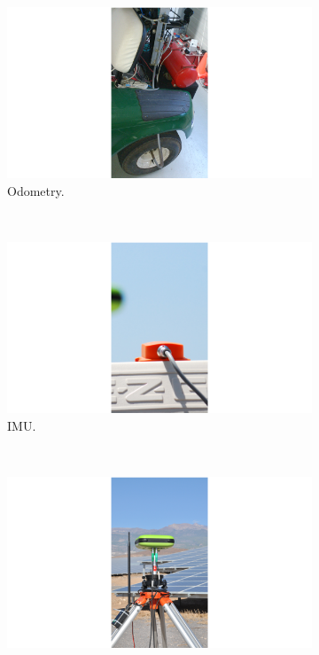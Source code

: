 \begin{figure}[h!]
        \centering
        \begin{subfigure}[b]{0.32\textwidth}
                \centering
                \includegraphics[width=\textwidth]{odometry}
                \caption{Odometry.}\label{fig:cp00_odometry}
        \end{subfigure}%
        ~ %
        \begin{subfigure}[b]{0.32\textwidth}
                \centering
                \includegraphics[width=\textwidth]{imu}
		\caption{\ac{IMU}.}\label{fig:cp00_imu}
        \end{subfigure}%
        ~ %
        \begin{subfigure}[b]{0.32\textwidth}
                \centering
                \includegraphics[width=\textwidth]{dgps}

\end{subfigure}
\end{figure}

